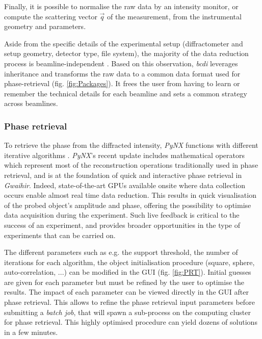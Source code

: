 Finally, it is possible to normalise the raw data by an intensity monitor, or compute the scattering vector $\vec{q}$ of the measurement, from the instrumental geometry and parameters.

Aside from the specific details of the experimental setup (diffractometer and setup geometry, detector type, file system), the majority of the data reduction process is beamline-independent \parencite{Yang2019a}.
Based on this observation, \textit{bcdi} leverages inheritance and transforms the raw data to a common data format used for phase-retrieval (fig. \ref{fig:Packages}).
It frees the user from having to learn or remember the technical details for each beamline and sets a common strategy across beamlines.

\subsubsection{Phase retrieval} \label{sec:phaseretrievalpynx}

To retrieve the phase from the diffracted intensity, \textit{PyNX} functions with different iterative algorithms \parencite{Gerchberg1972, Fienup1982, Fienup1978, Marchesini2007, FavreNicolin2020}.
\textit{PyNX}'s recent update includes mathematical operators \parencite{FavreNicolin2020} which represent most of the reconstruction operations traditionally used in phase retrieval, and is at the foundation of quick and interactive phase retrieval in \textit{Gwaihir}.
Indeed, state-of-the-art GPUs available onsite where data collection occurs enable almost real time data reduction.
This results in quick visualisation of the probed object's amplitude and phase, offering the possibility to optimise data acquisition during the experiment.
Such live feedback is critical to the success of an experiment, and provides broader opportunities in the type of experiments that can be carried on.

The different parameters such as e.g. the support threshold, the number of iterations for each algorithm, the object initialisation procedure (square, sphere, auto-correlation, ...) can be modified in the GUI (fig. \ref{fig:PRT}).
Initial guesses are given for each parameter but must be refined by the user to optimise the results.
The impact of each parameter can be viewed directly in the GUI after phase retrieval.
This allows to refine the phase retrieval input parameters before submitting a \textit{batch job}, that will spawn a sub-process on the computing cluster for phase retrieval.
This highly optimised procedure can yield dozens of solutions in a few minutes.


